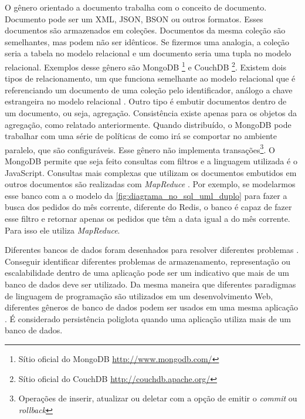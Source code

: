 O gênero orientado a documento trabalha com o conceito de documento. Documento pode ser um \ac{XML}, JSON, BSON ou outros formatos. Esses documentos são armazenados em coleções. Documentos da mesma coleção são semelhantes, mas podem não ser idênticos. Se fizermos uma analogia, a coleção seria a tabela no modelo relacional e um documento seria uma tupla no modelo relacional. Exemplos desse gênero são MongoDB \footnote{Sítio oficial do MongoDB \url{http://www.mongodb.com/}} e CouchDB \footnote{Sítio oficial do CouchDB \url{http://couchdb.apache.org/}}\cite{NoSQL}.
Existem dois tipos de relacionamento, um que funciona semelhante ao modelo relacional que é referenciando um documento de uma coleção pelo identificador, análogo a chave estrangeira no modelo relacional . Outro tipo é embutir documentos dentro de um documento, ou seja, agregação. Consistência existe apenas para os objetos da agregação, como relatado anteriormente. Quando distribuído, o MongoDB pode trabalhar com uma série de políticas de como irá se comportar no ambiente paralelo, que são configuráveis. Esse gênero não implementa transações\footnote{Operações de inserir, atualizar ou deletar com a opção de emitir o \textit{commit} ou \textit{rollback}}. O MongoDB permite que seja feito consultas com filtros e a linguagem utilizada é o JavaScript. Consultas mais complexas que utilizam os documentos embutidos em outros documentos são realizadas com \textit{MapReduce} \cite{NoSQL}. Por exemplo, se modelarmos esse banco com a o modelo da \autoref{fig:diagrama_no_sql_uml_duplo} para fazer a busca dos pedidos do mês corrente, diferente do \ac{Redis}, o banco é capaz de fazer esse filtro e retornar apenas os pedidos que têm a data igual a do mês corrente. Para isso ele utiliza \textit{MapReduce}.

Diferentes bancos de dados foram desenhados para resolver diferentes problemas \cite{NoSQL}. Conseguir identificar diferentes problemas de armazenamento, representação ou escalabilidade dentro de uma aplicação pode ser um indicativo que mais de um banco de dados deve ser utilizado. Da mesma maneira que diferentes paradigmas de linguagem de programação são utilizados em um desenvolvimento Web, diferentes gêneros de banco de dados podem ser usados em uma mesma aplicação \cite{multiparadigma}. É considerado persistência poliglota quando uma aplicação utiliza mais de um banco de dados.


